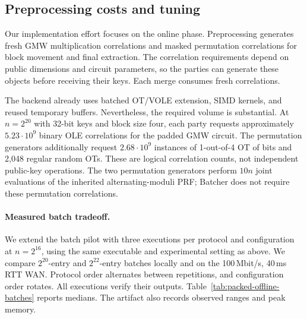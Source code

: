 \subsection{Preprocessing costs and tuning}
\label{sec:packed-offline}

Our implementation effort focuses on the online phase.
Preprocessing generates fresh GMW multiplication correlations and masked
permutation correlations for block movement and final extraction.
The correlation requirements depend on public dimensions and circuit parameters,
so the parties can generate these objects before receiving their keys.
Each merge consumes fresh correlations.

The backend already uses batched OT/VOLE extension, SIMD kernels, and reused
temporary buffers. Nevertheless, the required volume is substantial.
At $n=2^{20}$ with 32-bit keys and block size four, each party requests
approximately $5.23\cdot10^9$ binary OLE correlations for the padded GMW circuit.
The permutation generators additionally request $2.68\cdot10^9$ instances
of 1-out-of-4 OT of bits and 2,048 regular random OTs.
These are logical correlation counts, not independent public-key operations.
The two permutation generators perform $10n$ joint evaluations of the inherited
alternating-moduli PRF; Batcher does not require these permutation correlations.

\paragraph{Measured batch tradeoff.}
We extend the batch pilot with three executions per protocol and configuration
at $n=2^{16}$, using the same executable and experimental setting as above.
We compare $2^{20}$-entry and $2^{22}$-entry batches locally and on the
100\,Mbit/s, 40\,ms RTT WAN. Protocol order alternates between repetitions,
and configuration order rotates. All executions verify their outputs.
Table~\ref{tab:packed-offline-batches} reports medians.
The artifact also records observed ranges and peak memory.

\begin{table}[!htbp]
\centering
\small
\setlength{\tabcolsep}{4pt}

\caption{Preprocessing batch sensitivity at $n=2^{16}$ keys per list.
Each entry summarizes three executions. Total time includes preprocessing and
online time; TCP phase times use the slower party. Communication sums both
parties' sent bytes. The online circuit is identical across batch sizes.}
\label{tab:packed-offline-batches}
\end{table}

